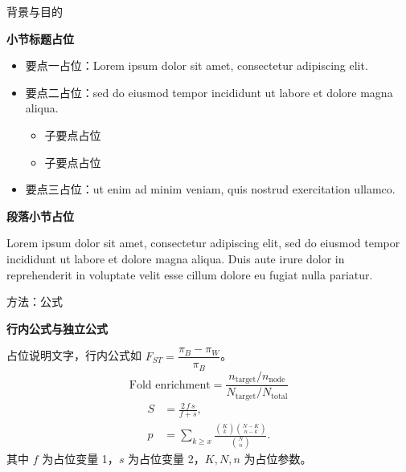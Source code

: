 \documentclass[aspectratio=169,11pt]{beamer}
\begin{document}
\begin{frame}{背景与目的}
  \begin{minipage}[t][.78\paperheight][t]{.92\paperwidth}
    \textbf{\color{ttl}\large 小节标题占位}\par\vspace{4pt}
    \begin{itemize}\setlength\itemsep{5pt}
      \item 要点一占位：Lorem ipsum dolor sit amet, consectetur adipiscing elit.
      \item 要点二占位：sed do eiusmod tempor incididunt ut labore et dolore magna aliqua.
      \begin{itemize}\item 子要点占位 \item 子要点占位\end{itemize}
      \item 要点三占位：ut enim ad minim veniam, quis nostrud exercitation ullamco.
    \end{itemize}
    \vspace{6pt}
    \textbf{\color{ttl}\large 段落小节占位}\par\vspace{4pt}
    \small Lorem ipsum dolor sit amet, consectetur adipiscing elit, sed do eiusmod tempor incididunt ut labore et dolore magna aliqua. Duis aute irure dolor in reprehenderit in voluptate velit esse cillum dolore eu fugiat nulla pariatur.
  \end{minipage}
\end{frame}

\begin{frame}{方法：公式}
  \begin{minipage}[t][.78\paperheight][t]{.92\paperwidth}
    \textbf{\color{ttl}\large 行内公式与独立公式}\par\vspace{4pt}
    占位说明文字，行内公式如 $F_{ST}=\dfrac{\pi_{B}-\pi_{W}}{\pi_{B}}$。
    \begin{equation}
      \text{Fold enrichment}=\frac{n_{\text{target}}/n_{\text{node}}}{N_{\text{target}}/N_{\text{total}}}
    \end{equation}
    \begin{align}
      S &= \frac{2\,f\,s}{f+s}, \label{eq:score}\\
      p &= \sum_{k\ge x}\frac{\binom{K}{k}\binom{N-K}{n-k}}{\binom{N}{n}}.
    \end{align}
    其中 $f$ 为占位变量 1，$s$ 为占位变量 2，$K,N,n$ 为占位参数。
  \end{minipage}
\end{frame}
\end{document}
